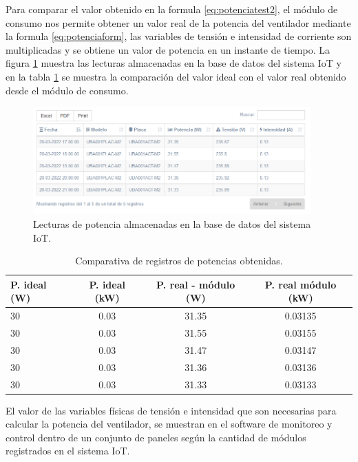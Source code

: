 Para comparar el valor obtenido en la formula \ref{eq:potenciatest2}, el módulo de consumo nos permite obtener un valor real de la potencia del ventilador mediante la formula \ref{eq:potenciaform}, las variables de tensión e intensidad de corriente son multiplicadas y se obtiene un valor de potencia en un instante de tiempo. La figura \ref{fig:registroPotencia} muestra las lecturas almacenadas en la base de datos del sistema IoT y en la tabla \ref{tab:tablapotencias} se muestra la comparación del valor ideal con el valor real obtenido desde el módulo de consumo.

\begin{figure}[htpb]
\centering 
\includegraphics[width=0.95\textwidth]{./Figures/test/consumo/lecturas.png}
\caption{Lecturas de potencia almacenadas en la base de datos del sistema IoT.}
\label{fig:registroPotencia}
\end{figure}


\begin{table}[h]
	\centering
	\caption[Comparativa de registros de potencias obtenidas]{Comparativa de registros de potencias obtenidas.}
	\begin{tabular}{l c c c}    
		\toprule
		\textbf{P. ideal (W)} 	 & \textbf{P. ideal (kW)}  & \textbf{P. real - módulo (W)} &\textbf{P. real módulo (kW)} \\
		\midrule
		30 & 0.03 & 31.35 & 0.03135\\		
		30& 0.03 & 31.55  &0.03155 \\
		30& 0.03 & 31.47 & 0.03147\\		
		30& 0.03 & 31.36 & 0.03136\\		
		30& 0.03 & 31.33 & 0.03133\\
		\bottomrule
		\hline
	\end{tabular}
	\label{tab:tablapotencias}
\end{table}

El valor de las variables físicas de tensión e intensidad que son necesarias para calcular la  potencia del ventilador, se muestran en el software de monitoreo y control dentro de un conjunto de paneles según la cantidad de módulos registrados en el sistema IoT.

